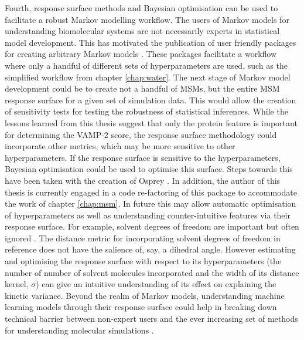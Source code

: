 Fourth, response surface methods and Bayesian optimisation can be used to facilitate a robust Markov modelling workflow. The users of Markov models for understanding biomolecular systems are not necessarily experts in statistical model development. This has motivated the publication of user friendly packages for creating arbitrary Markov models \cite{schererPyEMMASoftwarePackage2015a,beauchampMSMBuilder2ModelingConformational2011}. These packages facilitate a workflow where only a handful of different sets of hyperparameters are used, such as the simplified workflow from chapter \ref{chap:water}. The next stage of Markov model development could be to create not a handful of MSMs, but the entire MSM response surface for a given set of simulation data. This would allow the creation of sensitivity tests for testing the robustness of statistical inferences.  While the lessons learned from this thesis suggest that only the protein feature is important for determining the VAMP-2 score, the response surface methodology could incorporate other metrics, which may be more sensitive to other hyperparameters. If the response surface is sensitive to the hyperparameters, Bayesian optimisation could be used to optimise this surface.  Steps towards this have been taken with the creation of Osprey \cite{mcgibbonOspreyHyperparameterOptimization2016}.  In addition, the author of this thesis is currently engaged in a code re-factoring of this package to accommodate the work of chapter \ref{chap:msm}. In future this may allow automatic optimisation of hyperparameters as well as understanding counter-intuitive features via their response surface. For example, solvent degrees of freedom are important but often ignored \cite{guBuildingMarkovState2013}. The distance metric for incorporating solvent degrees of freedom in reference \cite{guBuildingMarkovState2013} does not have the salience of, say, a dihedral angle. However estimating and optimising the response surface with respect to its hyperparameters (the number of number of solvent molecules incorporated and the width of its distance kernel, $\sigma$) can give an intuitive understanding of its effect on explaining the kinetic variance. Beyond the realm of Markov models, understanding machine learning models through their response surface could help in breaking down technical barrier between non-expert users and the ever increasing set of methods for understanding molecular simulations \cite{noeMachineLearningMolecular2020}.




